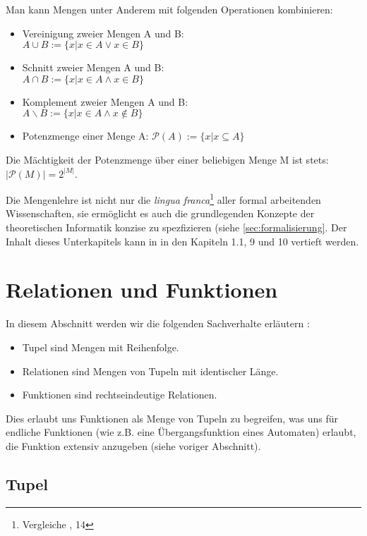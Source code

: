 Man kann Mengen unter Anderem mit folgenden Operationen kombinieren:
\begin{itemize}
    \item Vereinigung zweier Mengen A und B:\\
        $A \cup B := \{x|x \in A \vee x \in B\}$
    \item Schnitt zweier Mengen A und B:\\
        $A \cap B := \{x|x \in A \wedge x \in B\}$
    \item Komplement zweier Mengen A und B:\\
        $A \backslash B:= \{x|x \in A \wedge x \notin B\}$
    \item Potenzmenge einer Menge A: $\mathcal{P}(A) := \{x|x \subseteq A\}$
\end{itemize}

Die Mächtigkeit der Potenzmenge über einer beliebigen Menge M ist stets:
$|\mathcal{P}(M)| = 2^{|M|}$.


Die Mengenlehre ist nicht nur die \emph{lingua franca}\footnote{Vergleiche \cite{link}, 14}
aller formal arbeitenden Wissenschaften,
sie ermöglicht es auch die grundlegenden Konzepte der theoretischen Informatik
konzise zu spezfizieren (siehe \autoref{sec:formalisierung}.
Der Inhalt dieses Unterkapitels kann in \cite{link}
in den Kapiteln 1.1, 9 und 10 vertieft werden.

\section{Relationen und Funktionen}\label{relationenUndFunktionen}
In diesem Abschnitt werden wir die folgenden Sachverhalte erläutern :
\begin{itemize}
    \item Tupel sind Mengen mit Reihenfolge.
    \item Relationen sind Mengen von Tupeln mit identischer Länge.
    \item Funktionen sind rechtseindeutige Relationen.
\end{itemize}
Dies erlaubt uns Funktionen als Menge von Tupeln zu begreifen,
was uns für endliche Funktionen
(wie z.B. eine Übergangsfunktion eines Automaten)
erlaubt,
die Funktion extensiv anzugeben (siehe voriger Abschnitt).

\subsection{Tupel}

